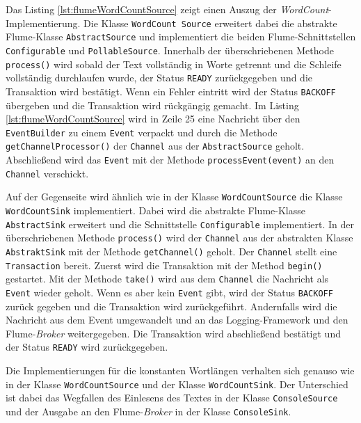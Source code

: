 Das Listing \ref{lst:flumeWordCountSource} zeigt einen Auszug der \textit{WordCount}-Implementierung. Die Klasse \texttt{WordCount Source} erweitert dabei die abstrakte Flume-Klasse \texttt{AbstractSource} und implementiert die beiden Flume-Schnittstellen \texttt{Configurable} und \texttt{PollableSource}. Innerhalb der überschriebenen Methode \texttt{process()} wird sobald der Text vollständig in Worte getrennt und die Schleife vollständig durchlaufen wurde, der Status \texttt{READY} zurückgegeben und die Transaktion wird bestätigt. Wenn ein Fehler eintritt wird der Status \texttt{BACKOFF} übergeben und die Transaktion wird rückgängig gemacht. Im Listing \ref{lst:flumeWordCountSource} wird in Zeile 25 eine Nachricht über den \texttt{EventBuilder} zu einem \texttt{Event} verpackt und durch die Methode \texttt{getChannelProcessor()} der \texttt{Channel} aus der \texttt{AbstractSource} geholt. Abschließend wird das \texttt{Event} mit der Methode \texttt{processEvent(event)} an den \texttt{Channel} verschickt.



Auf der Gegenseite wird ähnlich wie in der Klasse \texttt{WordCountSource} die Klasse \texttt{WordCountSink} implementiert. Dabei wird die abstrakte Flume-Klasse \texttt{AbstractSink} erweitert und die Schnittstelle \texttt{Configurable} implementiert. In der überschriebenen Methode \texttt{process()} wird der \texttt{Channel} aus der abstrakten Klasse \texttt{AbstraktSink} mit der Methode \texttt{getChannel()} geholt. Der \texttt{Channel} stellt eine \texttt{Transaction} bereit. Zuerst wird die Transaktion mit der Method \texttt{begin()} gestartet. Mit der Methode \texttt{take()} wird aus dem \texttt{Channel} die Nachricht als \texttt{Event} wieder geholt. Wenn es aber kein \texttt{Event} gibt, wird der Status \texttt{BACKOFF} zurück gegeben und die Transaktion wird zurückgeführt. Andernfalls wird die Nachricht aus dem Event umgewandelt und an das Logging-Framework und den Flume-\textit{Broker} weitergegeben. Die Transaktion wird abschließend bestätigt und der Status \texttt{READY} wird zurückgegeben.

Die Implementierungen für die konstanten Wortlängen verhalten sich genauso wie in der Klasse \texttt{WordCountSource} und der Klasse \texttt{WordCountSink}. Der Unterschied ist dabei das Wegfallen des Einlesens des Textes in der Klasse \texttt{ConsoleSource} und der Ausgabe an den Flume-\textit{Broker} in der Klasse \texttt{ConsoleSink}.

